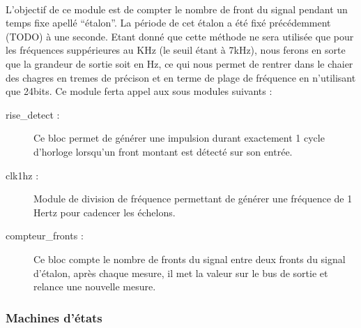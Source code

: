 \documentclass[a4paper,11pt]{article}
\begin{document}
\paragraph{} L'objectif de ce module est de compter le nombre de front du signal pendant un temps fixe apellé ``étalon''.
La période de cet étalon a été fixé précédemment (TODO) à une seconde. Etant donné que cette méthode ne sera utilisée que pour les 
fréquences suppérieures au KHz (le seuil étant à 7kHz), nous ferons en sorte que la grandeur de sortie soit en Hz, ce qui nous permet 
de rentrer dans le chaier des chagres en tremes de précison et en terme de plage de fréquence en n'utilisant que 24bits. Ce module 
ferta appel aux sous modules suivants :

\begin{description}
  \item[rise\_detect : ] Ce bloc permet de générer une impulsion durant exactement 1 cycle d'horloge lorsqu'un front montant est détecté
  sur son entrée.
  \item[clk1hz : ] Module de division de fréquence permettant de générer une fréquence de 1 Hertz pour cadencer les échelons.
  \item[compteur\_fronts : ] Ce bloc compte le nombre de fronts du signal entre deux fronts du signal d'étalon, après chaque mesure,
  il met la valeur sur le bus de sortie et relance une nouvelle mesure.
\end{description}


  \subsubsection{Machines d'états}
  
\end{document}
